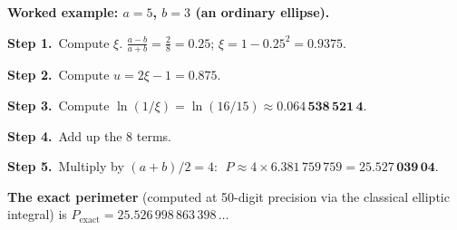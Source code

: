 \documentclass[10pt,landscape]{article}
\begin{document}
\begin{minipage}[t]{0.49\textwidth}
\small

\textbf{Worked example: $a = 5$, $b = 3$ (an ordinary ellipse).}

\textbf{Step 1.}\ Compute $\xi$.\;
$\frac{a-b}{a+b} = \frac{2}{8} = 0.25$;\;
$\xi = 1 - 0.25^2 = \mathbf{0.9375}.$

\textbf{Step 2.}\ Compute $u = 2\xi - 1 = \mathbf{0.875}.$

\textbf{Step 3.}\ Compute $\ln(1/\xi) = \ln(16/15) \approx
\mathbf{0.064\,538\,521\,4}.$

\textbf{Step 4.}\ Add up the 8 terms.

\smallskip
{}

\smallskip
\textbf{Step 5.}\ Multiply by $(a+b)/2 = 4$:
$\;P \approx 4 \times 6.381\,759\,759 = \mathbf{25.527\,039\,04}.$

\smallskip
\textbf{The exact perimeter} (computed at 50-digit precision via the
classical elliptic integral) is
$P_{\text{exact}} = 25.526\,998\,863\,398\,\ldots$


\end{minipage}
\end{document}
